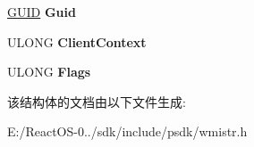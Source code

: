 \begin{DoxyCompactItemize}
\begin{tabbing}
\end{tabbing}\item 
\mbox{\label{struct___w_n_o_d_e___h_e_a_d_e_r_ab7103bd56f62ee843eb80f7885c5fcf1}} 
\hyperlink{interface_g_u_i_d}{G\+U\+ID} {\bfseries Guid}
\item 
\mbox{\label{struct___w_n_o_d_e___h_e_a_d_e_r_aabde5776aca46887067b9c1727ce02ac}} 
U\+L\+O\+NG {\bfseries Client\+Context}
\item 
\mbox{\label{struct___w_n_o_d_e___h_e_a_d_e_r_ae83c9368e599620f577063fbbf23fa2e}} 
U\+L\+O\+NG {\bfseries Flags}
\end{DoxyCompactItemize}


该结构体的文档由以下文件生成\+:\begin{DoxyCompactItemize}
\item 
E\+:/\+React\+O\+S-\/0../sdk/include/psdk/wmistr.\+h\end{DoxyCompactItemize}
